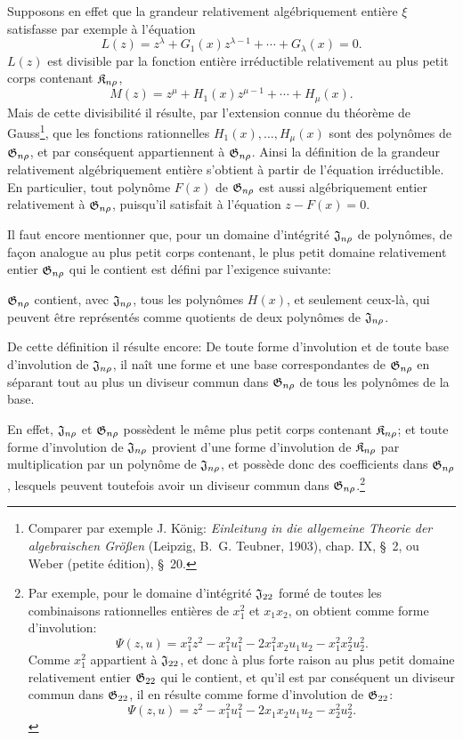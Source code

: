 Supposons en effet que la grandeur relativement algébriquement entière $\xi$ satisfasse par exemple à l'équation
\[
  L(z)=z^\lambda+G_1(x)z^{\lambda-1}+\cdots+G_\lambda(x)=0.
\]
$L(z)$ est divisible par la fonction entière irréductible relativement au plus petit corps contenant $\mathfrak{K}_{n\rho}$,
\[
  M(z)=z^\mu+H_1(x)z^{\mu-1}+\cdots+H_\mu(x).
\]
Mais de cette divisibilité il résulte, par l'extension connue du théorème de Gauss\footnote{Comparer par exemple J. König: \emph{Einleitung in die allgemeine Theorie der algebraischen Größen} (Leipzig, B.~G. Teubner, 1903), chap. IX, \S\ 2, ou Weber (petite édition), \S\ 20.}, que les fonctions rationnelles $H_1(x),\ldots,H_\mu(x)$ sont des polynômes de $\mathfrak{G}_{n\rho}$, et par conséquent appartiennent à $\mathfrak{G}_{n\rho}$. Ainsi la définition de la grandeur relativement algébriquement entière s'obtient à partir de l'équation irréductible. En particulier, tout polynôme $F(x)$ de $\mathfrak{G}_{n\rho}$ est aussi algébriquement entier relativement à $\mathfrak{G}_{n\rho}$, puisqu'il satisfait à l'équation $z-F(x)=0$.

Il faut encore mentionner que, pour un domaine d’intégrité $\mathfrak{J}_{n\rho}$ de polynômes, de façon analogue au plus petit corps contenant, le plus petit domaine relativement entier $\mathfrak{G}_{n\rho}$ qui le contient est défini par l'exigence suivante:

$\mathfrak{G}_{n\rho}$ contient, avec $\mathfrak{J}_{n\rho}$, tous les polynômes $H(x)$, et seulement ceux-là, qui peuvent être représentés comme quotients de deux polynômes de $\mathfrak{J}_{n\rho}$.

De cette définition il résulte encore: De toute forme d'involution et de toute base d'involution de $\mathfrak{J}_{n\rho}$, il naît une forme et une base correspondantes de $\mathfrak{G}_{n\rho}$ en séparant tout au plus un diviseur commun dans $\mathfrak{G}_{n\rho}$ de tous les polynômes de la base.

En effet, $\mathfrak{J}_{n\rho}$ et $\mathfrak{G}_{n\rho}$ possèdent le même plus petit corps contenant $\mathfrak{K}_{n\rho}$; et toute forme d'involution de $\mathfrak{J}_{n\rho}$ provient d'une forme d'involution de $\mathfrak{K}_{n\rho}$ par multiplication par un polynôme de $\mathfrak{J}_{n\rho}$, et possède donc des coefficients dans $\mathfrak{G}_{n\rho}$, lesquels peuvent toutefois avoir un diviseur commun dans $\mathfrak{G}_{n\rho}$.\footnote{Par exemple, pour le domaine d’intégrité $\mathfrak{J}_{22}$ formé de toutes les combinaisons rationnelles entières de $x_1^2$ et $x_1x_2$, on obtient comme forme d'involution:
\[
\Psi(z,u)=x_1^2z^2-x_1^2u_1^2-2x_1^2x_2u_1u_2-x_1^2x_2^2u_2^2.
\]
Comme $x_1^2$ appartient à $\mathfrak{J}_{22}$, et donc à plus forte raison au plus petit domaine relativement entier $\mathfrak{G}_{22}$ qui le contient, et qu'il est par conséquent un diviseur commun dans $\mathfrak{G}_{22}$, il en résulte comme forme d'involution de $\mathfrak{G}_{22}$:
\[
\Psi(z,u)=z^2-x_1^2u_1^2-2x_1x_2u_1u_2-x_2^2u_2^2.
\]}

